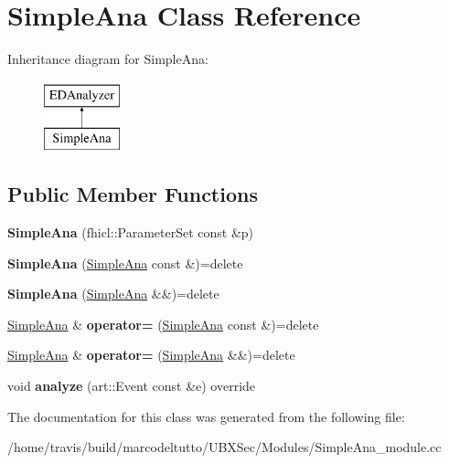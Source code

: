 \hypertarget{classSimpleAna}{\section{Simple\-Ana Class Reference}
\label{classSimpleAna}
}
Inheritance diagram for Simple\-Ana\-:\begin{figure}[H]
\begin{center}
\leavevmode
\includegraphics[height=2.000000cm]{classSimpleAna}
\end{center}
\end{figure}
\subsection*{Public Member Functions}
\begin{DoxyCompactItemize}
\item 
\hypertarget{classSimpleAna_a3a77d7c369c80d023aae7b59d6227e6a}{{\bfseries Simple\-Ana} (fhicl\-::\-Parameter\-Set const \&p)}\label{classSimpleAna_a3a77d7c369c80d023aae7b59d6227e6a}

\item 
\hypertarget{classSimpleAna_a4b50330389cec2d0891f2f4513661067}{{\bfseries Simple\-Ana} (\hyperlink{classSimpleAna}{Simple\-Ana} const \&)=delete}\label{classSimpleAna_a4b50330389cec2d0891f2f4513661067}

\item 
\hypertarget{classSimpleAna_a79791024bf5000e5111b58174a5eb72f}{{\bfseries Simple\-Ana} (\hyperlink{classSimpleAna}{Simple\-Ana} \&\&)=delete}\label{classSimpleAna_a79791024bf5000e5111b58174a5eb72f}

\item 
\hypertarget{classSimpleAna_a4cf298974f343a443db71375eae286ec}{\hyperlink{classSimpleAna}{Simple\-Ana} \& {\bfseries operator=} (\hyperlink{classSimpleAna}{Simple\-Ana} const \&)=delete}\label{classSimpleAna_a4cf298974f343a443db71375eae286ec}

\item 
\hypertarget{classSimpleAna_a394c98e3c87a64948a8f2950f411aacc}{\hyperlink{classSimpleAna}{Simple\-Ana} \& {\bfseries operator=} (\hyperlink{classSimpleAna}{Simple\-Ana} \&\&)=delete}\label{classSimpleAna_a394c98e3c87a64948a8f2950f411aacc}

\item 
\hypertarget{classSimpleAna_aef71affb349332a3f5c5fdea2af747e1}{void {\bfseries analyze} (art\-::\-Event const \&e) override}\label{classSimpleAna_aef71affb349332a3f5c5fdea2af747e1}

\end{DoxyCompactItemize}


The documentation for this class was generated from the following file\-:\begin{DoxyCompactItemize}
\item 
/home/travis/build/marcodeltutto/\-U\-B\-X\-Sec/\-Modules/Simple\-Ana\-\_\-module.\-cc\end{DoxyCompactItemize}
